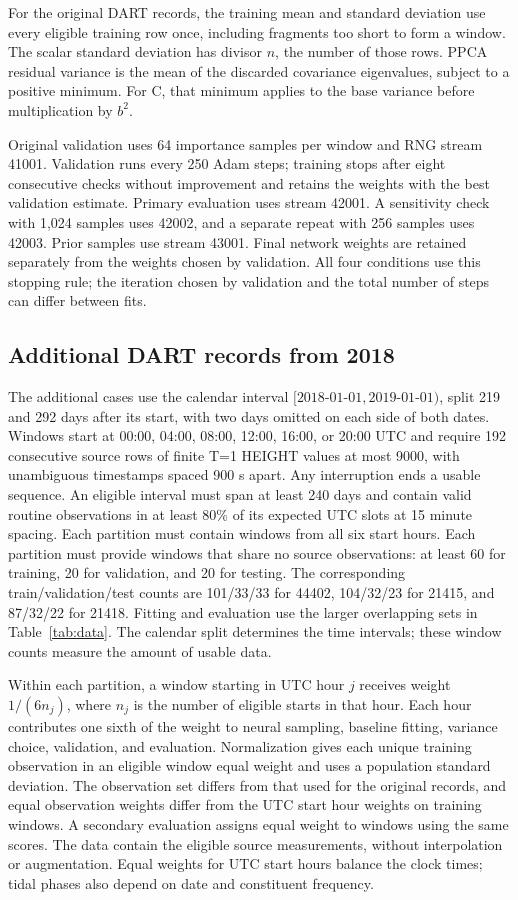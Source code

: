 \documentclass{article}
\begin{document}
For the original DART records, the training mean and standard deviation use every eligible training row once, including fragments too short to form a window. The scalar standard deviation has divisor $n$, the number of those rows. PPCA residual variance is the mean of the discarded covariance eigenvalues, subject to a positive minimum. For C, that minimum applies to the base variance before multiplication by $b^2$.

Original validation uses 64 importance samples per window and RNG stream 41001. Validation runs every 250 Adam steps; training stops after eight consecutive checks without improvement and retains the weights with the best validation estimate. Primary evaluation uses stream 42001. A sensitivity check with 1,024 samples uses 42002, and a separate repeat with 256 samples uses 42003. Prior samples use stream 43001. Final network weights are retained separately from the weights chosen by validation. All four conditions use this stopping rule; the iteration chosen by validation and the total number of steps can differ between fits.

\subsection{Additional DART records from 2018}
The additional cases use the calendar interval $[2018\text{-}01\text{-}01,2019\text{-}01\text{-}01)$, split 219 and 292 days after its start, with two days omitted on each side of both dates. Windows start at 00:00, 04:00, 08:00, 12:00, 16:00, or 20:00 UTC and require 192 consecutive source rows of finite T=1 HEIGHT values at most 9000, with unambiguous timestamps spaced 900 s apart. Any interruption ends a usable sequence. An eligible interval must span at least 240 days and contain valid routine observations in at least 80\% of its expected UTC slots at 15 minute spacing. Each partition must contain windows from all six start hours. Each partition must provide windows that share no source observations: at least 60 for training, 20 for validation, and 20 for testing. The corresponding train/validation/test counts are 101/33/33 for 44402, 104/32/23 for 21415, and 87/32/22 for 21418. Fitting and evaluation use the larger overlapping sets in Table~\ref{tab:data}. The calendar split determines the time intervals; these window counts measure the amount of usable data.

Within each partition, a window starting in UTC hour $j$ receives weight $1/(6n_j)$, where $n_j$ is the number of eligible starts in that hour. Each hour contributes one sixth of the weight to neural sampling, baseline fitting, variance choice, validation, and evaluation. Normalization gives each unique training observation in an eligible window equal weight and uses a population standard deviation. The observation set differs from that used for the original records, and equal observation weights differ from the UTC start hour weights on training windows. A secondary evaluation assigns equal weight to windows using the same scores. The data contain the eligible source measurements, without interpolation or augmentation. Equal weights for UTC start hours balance the clock times; tidal phases also depend on date and constituent frequency.
\end{document}
